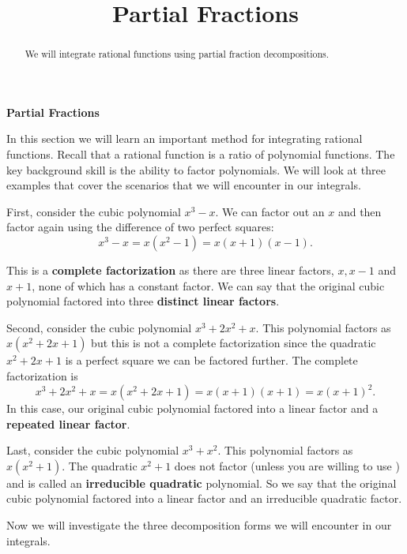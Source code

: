 \documentclass{ximera}
\title{Partial Fractions}
\begin{document}
\begin{abstract}
We will integrate rational functions using partial fraction decompositions.
\end{abstract}

\maketitle

\begin{center}
\textbf{Partial Fractions}
\end{center}

In this section we will learn an important method for integrating rational functions.
Recall that a rational function is a ratio of polynomial functions. The key background skill is the ability to factor polynomials.
We will look at three examples that cover the scenarios that we will encounter in our integrals. 

First, consider the cubic polynomial  $x^3 - x$.  
We can factor out an $x$ and then factor again using the difference of two perfect squares:
\[
x^3 - x = x(x^2-1) = x(x+1)(x-1).
\]

This is a \textbf{complete factorization} as there are three linear factors, $x, x-1$ and $x+1$, none of which has a constant factor.
We can say that the original cubic polynomial factored into three \textbf{distinct linear factors}.

Second, consider the cubic polynomial $x^3 + 2x^2 + x$.  This polynomial factors as $x(x^2 + 2x + 1)$ but this is not a complete factorization since
the quadratic $x^2 + 2x + 1$ is a perfect square we can be factored further.  The complete factorization is 
\[
x^3 + 2x^2 + x= x(x^2 + 2x + 1) = x(x+1)(x+1) = x(x+1)^2.
\]
In this case, our original cubic polynomial factored into a linear factor and a \textbf{repeated linear factor}.

Last, consider the cubic polynomial $x^3 + x^2$.  This polynomial factors as $x(x^2 + 1)$.
The quadratic $x^2 + 1$ does not factor (unless you are willing to 
use ) and is called 
an \textbf{irreducible quadratic} polynomial.
So we say that the original cubic polynomial factored into a linear factor and an irreducible quadratic factor.

Now we will investigate the three decomposition forms we will encounter in our integrals.
\end{document}

